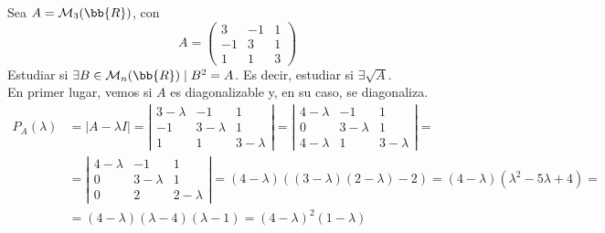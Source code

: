 \begin{ejercicio}
    Sea $A=\mathcal{M}_3(\bb{R})$, con
    \begin{equation*}
        A = \left(\begin{array}{ccc}
            3 & -1 & 1 \\
            -1 & 3 & 1 \\
            1 & 1 & 3
        \end{array} \right)
    \end{equation*}
    Estudiar si $\exists B \in \mathcal{M}_n(\bb{R}) \mid B^2=A$. Es decir, estudiar si $\exists \sqrt{A}$.\\

    En primer lugar, vemos si $A$ es diagonalizable y, en su caso, se diagonaliza.
    \begin{equation*}\begin{split}
        P_A(\lambda) & = |A-\lambda I| = \left|\begin{array}{ccc}
            3-\lambda & -1 & 1 \\
            -1 & 3-\lambda & 1 \\
            1 & 1 & 3-\lambda
        \end{array} \right| = \left|\begin{array}{ccc}
            4-\lambda & -1 & 1 \\
            0 & 3-\lambda & 1 \\
            4-\lambda & 1 & 3-\lambda
        \end{array} \right| = \\
        &= \left|\begin{array}{ccc}
            4-\lambda & -1 & 1 \\
            0 & 3-\lambda & 1 \\
            0 & 2 & 2-\lambda
        \end{array} \right| = (4-\lambda)((3-\lambda)(2-\lambda)-2) = (4-\lambda)(\lambda^2-5\lambda+4) =\\
        &=(4-\lambda)(\lambda-4)(\lambda-1) = (4-\lambda)^2(1-\lambda)
    \end{split}\end{equation*}


\end{ejercicio}
